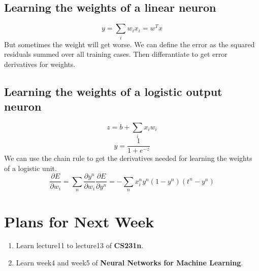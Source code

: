 \documentclass{article}
\begin{document}
\subsection{Learning the weights of a linear neuron}
\[y = \sum\limits_i w_ix_i = w^Tx\]
But sometimes the weight will get worse. We can define the error as the squared residuals summed over all training cases. Then differantiate to get error derivatives for weights.

\subsection{Learning the weights of a logistic output neuron}
\[z = b + \sum\limits_i x_iw_i\]
\[y = \frac{1}{1 + e^{-z}}\]
We can use the chain rule to get the derivatives needed for learning the weights of a logistic unit.
\[\frac{\partial E}{\partial w_i} = \sum\limits_n \frac{\partial y^n}{\partial w_i}\frac{\partial E}{\partial y^n} = -\sum\limits_n x_i^ny^n(1 - y^n)(t^n - y^n)\]

\section{Plans for Next Week}
\begin{enumerate}
  \item Learn lecture11 to lecture13 of  \textbf{CS231n}.
  \item Learn week4 and week5 of \textbf{Neural Networks for Machine Learning}.
\end{enumerate}
\end{document}
